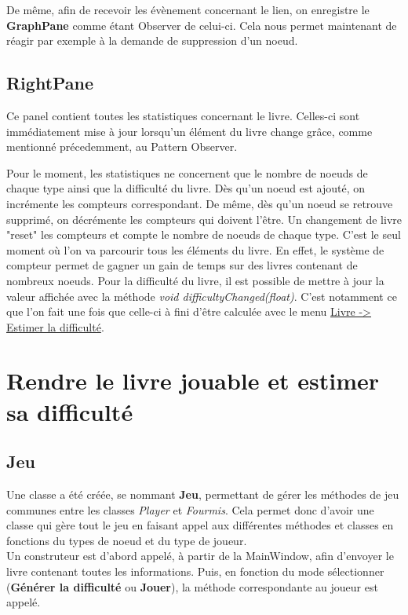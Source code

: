 				De même, afin de recevoir les évènement concernant le lien, on enregistre le \textbf{GraphPane} comme étant Observer de celui-ci. Cela nous permet maintenant de réagir par exemple à la demande de suppression d'un noeud.

		\subsection{RightPane}

			Ce panel contient toutes les statistiques concernant le livre. Celles-ci sont immédiatement mise à jour lorsqu'un élément du livre change grâce, comme mentionné précedemment, au Pattern Observer.

			Pour le moment, les statistiques ne concernent que le nombre de noeuds de chaque type ainsi que la difficulté du livre. Dès qu'un noeud est ajouté, on incrémente les compteurs correspondant. De même, dès qu'un noeud se retrouve supprimé, on décrémente les compteurs qui doivent l'être. Un changement de livre "reset" les compteurs et compte le nombre de noeuds de chaque type. C'est le seul moment où l'on va parcourir tous les éléments du livre. En effet, le système de compteur permet de gagner un gain de temps sur des livres contenant de nombreux noeuds. Pour la difficulté du livre, il est possible de mettre à jour la valeur affichée avec la méthode \textit{void difficultyChanged(float)}. C'est notamment ce que l'on fait une fois que celle-ci à fini d'être calculée avec le menu \underline{Livre -> Estimer la difficulté}.

	\section{Rendre le livre jouable et estimer sa difficulté}
		\label{sec:Jeu}

		\subsection{Jeu}

			Une classe a été créée, se nommant \textbf{Jeu}, permettant de gérer les méthodes de jeu communes entre les classes \textit{Player} et \textit{Fourmis}. Cela permet donc d'avoir une classe qui gère tout le jeu en faisant appel aux différentes méthodes et classes en fonctions du types de noeud et du type de joueur. \\
			Un construteur est d'abord appelé, à partir de la MainWindow, afin d'envoyer le livre contenant toutes les informations. Puis, en fonction du mode sélectionner (\textbf{Générer la difficulté} ou \textbf{Jouer}), la méthode correspondante au joueur est appelé.\\

